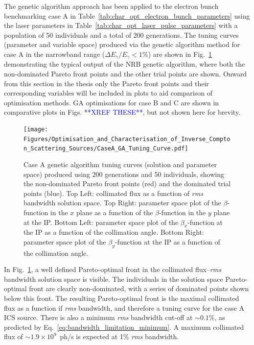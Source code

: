 \documentclass[../main.tex]{subfiles}
\begin{document}
The genetic algorithm approach has been applied to the electron bunch benchmarking case A in Table~\ref{tab:char_opt_electron_bunch_parameters} using the laser parameters in Table~\ref{tab:char_opt_laser_pulse_parameters} with a population of 50 individuals and a total of 200 generations. The tuning curves (parameter and variable space) produced via the genetic algorithm method for case A in the narrowband range ($\Delta E_{\gamma}/E_{\gamma}<1\%$) are shown in Fig.~\ref{fig:case_A_GA_tuning_curves} demonstrating the typical output of the NRB genetic algorithm, where both the non-dominated Pareto front points and the other trial points are shown. Onward from this section in the thesis only the Pareto front points and their corresponding variables will be included in plots to aid comparison of optimisation methods. GA optimisations for case B and C are shown in comparative plots in Figs. \textcolor{blue}{**XREF THESE**}, but not shown here for brevity. 
\begin{figure}[!h]
\centering
\texttt{[image: Figures/Optimisation\_and\_Characterisation\_of\_Inverse\_Compton\_Scattering\_Sources/CaseA\_GA\_Tuning\_Curve.pdf]}
\caption{Case A genetic algorithm tuning curves (solution and parameter space) produced using 200 generations and 50 individuals, showing the non-dominated Pareto front points (red) and the dominated trial points (blue). Top Left: collimated flux as a function of \textit{rms} bandwidth solution space. Top Right: parameter space plot of the $\beta$-function in the $x$ plane as a function of the $\beta$-function in the $y$ plane at the IP. Bottom Left: parameter space plot of the $\beta_{x}$-function at the IP as a function of the collimation angle. Bottom Right: parameter space plot of the $\beta_{y}$-function at the IP as a function of the collimation angle.}
\label{fig:case_A_GA_tuning_curves}
\end{figure}

In Fig.~\ref{fig:case_A_GA_tuning_curves}, a well defined Pareto-optimal front in the collimated flux--\textit{rms} bandwidth solution space is visible. The individuals in the solution space Pareto-optimal front are clearly non-dominated, with a series of dominated points shown below this front. The resulting Pareto-optimal front is the maximal collimated flux as a function if \textit{rms} bandwidth, and therefore a tuning curve for the case A ICS source. There is also a minimum \textit{rms} bandwidth cut-off at $\sim 0.1$\%, as predicted by Eq.~\ref{eq:bandwidth_limitation_minimum}. A maximum collimated flux of $\sim 1.9\times 10^{9}$~ph/\si{\second} is expected at 1\% \textit{rms} bandwidth.
\end{document}
